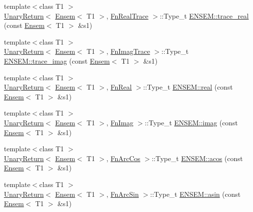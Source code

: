 \begin{DoxyCompactItemize}
{\footnotesize template$<$class T1 $>$ }\\\mbox{\hyperlink{structENSEM_1_1UnaryReturn}{Unary\+Return}}$<$ \mbox{\hyperlink{classENSEM_1_1Ensem}{Ensem}}$<$ T1 $>$, \mbox{\hyperlink{structENSEM_1_1FnRealTrace}{Fn\+Real\+Trace}} $>$\+::Type\+\_\+t \mbox{\hyperlink{group__eensem_gad19d894f22555d78d30d2e186300fb11}{E\+N\+S\+E\+M\+::trace\+\_\+real}} (const \mbox{\hyperlink{classENSEM_1_1Ensem}{Ensem}}$<$ T1 $>$ \&s1)
\item 
{\footnotesize template$<$class T1 $>$ }\\\mbox{\hyperlink{structENSEM_1_1UnaryReturn}{Unary\+Return}}$<$ \mbox{\hyperlink{classENSEM_1_1Ensem}{Ensem}}$<$ T1 $>$, \mbox{\hyperlink{structENSEM_1_1FnImagTrace}{Fn\+Imag\+Trace}} $>$\+::Type\+\_\+t \mbox{\hyperlink{group__eensem_ga26802b2d0529b6b46a86cf2a04647476}{E\+N\+S\+E\+M\+::trace\+\_\+imag}} (const \mbox{\hyperlink{classENSEM_1_1Ensem}{Ensem}}$<$ T1 $>$ \&s1)
\item 
{\footnotesize template$<$class T1 $>$ }\\\mbox{\hyperlink{structENSEM_1_1UnaryReturn}{Unary\+Return}}$<$ \mbox{\hyperlink{classENSEM_1_1Ensem}{Ensem}}$<$ T1 $>$, \mbox{\hyperlink{structENSEM_1_1FnReal}{Fn\+Real}} $>$\+::Type\+\_\+t \mbox{\hyperlink{group__eensem_ga633b11ccc18bea07f60b3c9589dafe58}{E\+N\+S\+E\+M\+::real}} (const \mbox{\hyperlink{classENSEM_1_1Ensem}{Ensem}}$<$ T1 $>$ \&s1)
\item 
{\footnotesize template$<$class T1 $>$ }\\\mbox{\hyperlink{structENSEM_1_1UnaryReturn}{Unary\+Return}}$<$ \mbox{\hyperlink{classENSEM_1_1Ensem}{Ensem}}$<$ T1 $>$, \mbox{\hyperlink{structENSEM_1_1FnImag}{Fn\+Imag}} $>$\+::Type\+\_\+t \mbox{\hyperlink{group__eensem_gab3382717c5ea66ead42fa648ad4cefbc}{E\+N\+S\+E\+M\+::imag}} (const \mbox{\hyperlink{classENSEM_1_1Ensem}{Ensem}}$<$ T1 $>$ \&s1)
\item 
{\footnotesize template$<$class T1 $>$ }\\\mbox{\hyperlink{structENSEM_1_1UnaryReturn}{Unary\+Return}}$<$ \mbox{\hyperlink{classENSEM_1_1Ensem}{Ensem}}$<$ T1 $>$, \mbox{\hyperlink{structENSEM_1_1FnArcCos}{Fn\+Arc\+Cos}} $>$\+::Type\+\_\+t \mbox{\hyperlink{group__eensem_ga31bcbfa79251bff0ce60e7d8fb2b8ff3}{E\+N\+S\+E\+M\+::acos}} (const \mbox{\hyperlink{classENSEM_1_1Ensem}{Ensem}}$<$ T1 $>$ \&s1)
\item 
{\footnotesize template$<$class T1 $>$ }\\\mbox{\hyperlink{structENSEM_1_1UnaryReturn}{Unary\+Return}}$<$ \mbox{\hyperlink{classENSEM_1_1Ensem}{Ensem}}$<$ T1 $>$, \mbox{\hyperlink{structENSEM_1_1FnArcSin}{Fn\+Arc\+Sin}} $>$\+::Type\+\_\+t \mbox{\hyperlink{group__eensem_gada63412fd27e80930e9d85703ba2394b}{E\+N\+S\+E\+M\+::asin}} (const \mbox{\hyperlink{classENSEM_1_1Ensem}{Ensem}}$<$ T1 $>$ \&s1)

\end{DoxyCompactItemize}
